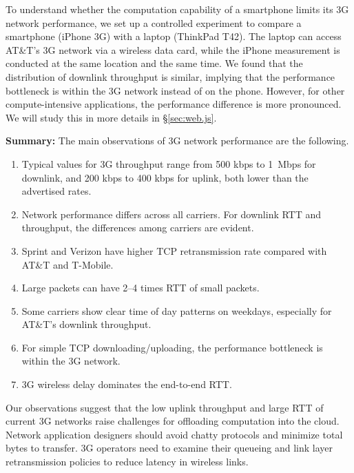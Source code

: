 To understand whether the computation capability of a smartphone
limits its 3G network performance, we set up a controlled experiment to
compare a smartphone (iPhone 3G) with a laptop (ThinkPad T42). The 
laptop can access AT\&T's 3G network via a wireless data card, while 
the iPhone measurement is conducted at the same location and the 
same time. We found that the distribution of downlink throughput is 
similar, implying that the performance bottleneck is within the 
3G network instead of on the phone. However, for other 
compute-intensive applications, the performance difference is
more pronounced. We will study this in more details in \S\ref{sec:web.js}.

\noindent\textbf{Summary:}  The main observations of 3G network
performance are the following.

\begin{enumerate}
\item Typical values for 3G throughput range from 500 kbps to 1~Mbps
for downlink, and 200 kbps to 400 kbps for uplink, both lower than 
the advertised rates.

\item Network performance differs across all carriers. For downlink 
RTT and throughput, the differences among carriers are evident.

\item Sprint and Verizon have higher TCP retransmission rate 
compared with AT\&T and T-Mobile.

\item Large packets can have 2--4 times RTT of small packets.

\item Some carriers show clear time of day patterns on weekdays, 
especially for AT\&T's downlink throughput.

\item For simple TCP downloading/uploading, the performance 
bottleneck is within the 3G network.

\item 3G wireless delay dominates the end-to-end RTT.
\end{enumerate}

Our observations suggest that the low uplink throughput and large
RTT of current 3G networks raise challenges for offloading computation 
into the cloud. Network application designers should avoid chatty 
protocols and minimize total bytes to transfer. 3G operators need to 
examine their queueing and link layer retransmission policies to 
reduce latency in wireless links. 



